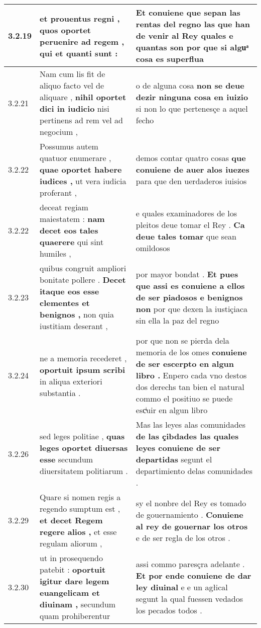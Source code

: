 \begin{tabular}{|p{1cm}|p{6.5cm}|p{6.5cm}|}
3.2.19 & et prouentus regni , \textbf{ quos oportet peruenire ad regem , } qui et quanti sunt : & Et conuiene que sepan las rentas del regno \textbf{ las que han de venir al Rey quales e quantas son } por que si alguͣ cosa es superflua \\\hline
3.2.21 & Nam cum lis fit de aliquo facto vel de aliquare , \textbf{ nihil oportet dici in iudicio } nisi pertinens ad rem vel ad negocium , & o de alguna cosa \textbf{ non se deue dezir ninguna cosa en iuizio } si non lo que pertenesçe a aquel fecho \\\hline
3.2.22 & Possumus autem quatuor enumerare , \textbf{ quae oportet habere iudices , } ut vera iudicia proferant , & demos contar quatro cosas \textbf{ que conuiene de auer alos iuezes } para que den uerdaderos iuisios \\\hline
3.2.22 & deceat regiam maiestatem : \textbf{ nam decet eos tales quaerere } qui sint humiles , & e quales examinadores de los pleitos deue tomar el Rey . \textbf{ Ca deue tales tomar } que sean omildosos \\\hline
3.2.23 & quibus congruit ampliori bonitate pollere . \textbf{ Decet itaque eos esse clementes et benignos , } non quia iustitiam deserant , & por mayor bondat . \textbf{ Et pues que assi es conuiene a ellos de ser piadosos e benignos non } por que dexen la iustiçiaca sin ella la paz del regno \\\hline
3.2.24 & ne a memoria recederet , \textbf{ oportuit ipsum scribi } in aliqua exteriori substantia . & por que non se pierda dela memoria de los omes \textbf{ conuiene de ser escerpto en algun libro . } Enpero cada vno destos dos derechs tan bien el natural commo el positiuo se puede escͥuir en algun libro \\\hline
3.2.26 & sed leges politiae , \textbf{ quas leges oportet diuersas esse } secundum diuersitatem politiarum . & Mas las leyes alas comunidades \textbf{ de las çibdades las quales leyes conuiene de ser departidas } segunt el departimiento delas comunidades . \\\hline
3.2.29 & Quare si nomen regis a regendo sumptum est , \textbf{ et decet Regem regere alios , } et esse regulam aliorum , & sy el nonbre del Rey es tomado de gouernamiento . \textbf{ Conuiene al rey de gouernar los otros } e de ser regla de los otros . \\\hline
3.2.30 & ut in prosequendo patebit : \textbf{ oportuit igitur dare legem euangelicam et diuinam , } secundum quam prohiberentur & assi commo paresçra adelante . \textbf{ Et por ende conuiene de dar ley diuinal } e e un agłical segunt la qual fuessen vedados los pecados todos . \\\hline

\end{tabular}
